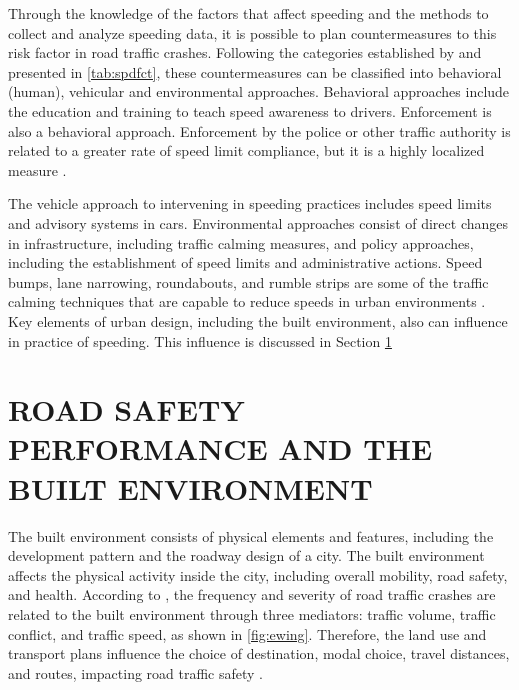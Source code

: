 Through the knowledge of the factors that affect speeding and the methods to collect and analyze speeding data, it is possible to plan countermeasures to this risk factor in road traffic crashes. Following the categories established by \textcite{Haddon1980} and presented in \autoref{tab:spdfct}, these countermeasures can be classified into behavioral (human), vehicular and environmental approaches. Behavioral approaches include the education and training to teach speed awareness to drivers. Enforcement is also a behavioral approach. Enforcement by the police or other traffic authority is related to a greater rate of speed limit compliance, but it is a highly localized measure \cite{Shinar2017}. 

The vehicle approach to intervening in speeding practices includes speed limits and advisory systems in cars. Environmental approaches consist of direct changes in infrastructure, including traffic calming measures, and policy approaches, including the establishment of speed limits and administrative actions. Speed bumps, lane narrowing, roundabouts, and rumble strips are some of the traffic calming techniques that are capable to reduce speeds in urban environments \cite{Welle2016}. Key elements of urban design, including the built environment, also can influence in practice of speeding. This influence is discussed in Section \ref{be}

\section{ROAD SAFETY PERFORMANCE AND THE BUILT ENVIRONMENT} \label{be}





The built environment consists of physical elements and features, including the development pattern and the roadway design of a city. The built environment affects the physical activity inside the city, including overall mobility, road safety, and health. According to \textcite{Ewing2009}, the frequency and severity of road traffic crashes are related to the built environment through three mediators: traffic volume, traffic conflict, and traffic speed, as shown in \autoref{fig:ewing}. Therefore, the land use and transport plans influence the choice of destination, modal choice, travel distances, and routes, impacting road traffic safety \cite{Tiwari}.  

